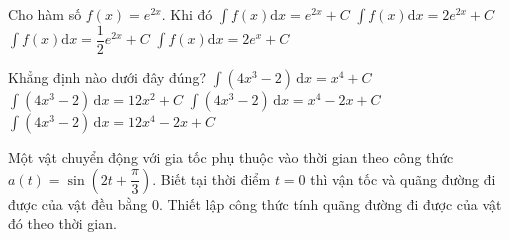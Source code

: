 \begin{ex}%
	 Cho hàm số $f(x) = e^{2x}$. Khi đó
	\choice 
		{$\displaystyle\int f(x)  \mathrm{d}x = e^{2x} + C$}
		{$\displaystyle\int  f(x) \mathrm{d}x = 2e^{2x} + C$}
		 {\True $\displaystyle\int f(x) \mathrm{d}x = \dfrac{1}{2}e^{2x} + C$}
		{$\displaystyle\int f(x) \mathrm{d}x = 2e^x + C$} 
\end{ex}

\begin{ex}%
	Khẳng định nào dưới đây đúng? 
	\choice 
		 {$\displaystyle \int\left(4 x^3-2\right)\mathrm{\,d}x=x^4+C$}
		 {$\displaystyle \int\left(4 x^3-2\right)\mathrm{\,d}x=12 x^2+C$}
		{\True  $\displaystyle \int\left(4 x^3-2\right)\mathrm{\,d}x=x^4-2 x+C$}
		{$\displaystyle \int\left(4  x^3-2\right)\mathrm{\,d}x=12 x^4-2 x+C$}
\end{ex}

\begin{bt}%
	Một vật chuyển động với gia tốc phụ thuộc vào thời gian theo công thức $a(t)=\sin \left(2t+\dfrac{\pi}{3}\right)$. Biết tại thời điểm $t=0$ thì vận tốc và quãng đường đi được của vật đều bằng $0$. Thiết lập công thức tính quãng đường đi được của vật đó  theo thời gian.
\end{bt}

